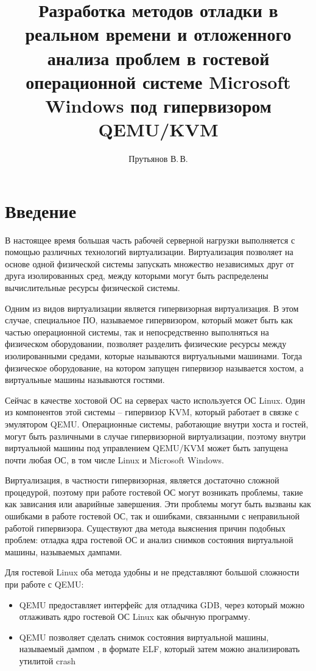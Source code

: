 \documentclass{mipt-thesis-bs}
\title{Разработка методов отладки в реальном времени и отложенного анализа проблем в гостевой операционной системе Microsoft Windows под гипервизором QEMU/KVM}
\author{Прутьянов В.\,В.}
\begin{document}
\titlecontents

\chapter{Введение}

В настоящее время большая часть рабочей серверной нагрузки выполняется с помощью различных технологий виртуализации. Виртуализация позволяет на основе одной физической системы запускать множество независимых друг от друга изолированных сред, между которыми могут быть распределены вычислительные ресурсы физической системы.

Одним из видов виртуализации является гипервизорная виртуализация. В этом случае, специальное ПО, называемое гипервизором, который может быть как частью операционной системы, так и непосредственно выполняться на физическом оборудовании, позволяет разделить физические ресурсы между изолированными средами, которые называются виртуальными машинами. Тогда физическое оборудование, на котором запущен гипервизор называется хостом, а виртуальные машины называются гостями.

Сейчас в качестве хостовой ОС на серверах часто используется ОС Linux. Один из компонентов этой системы -- гипервизор KVM, который работает в связке с эмулятором QEMU. Операционные системы, работающие внутри хоста и гостей, могут быть различными в случае гипервизорной виртуализации, поэтому внутри виртуальной машины под управлением QEMU/KVM может быть запущена почти любая ОС, в том числе Linux и Microsoft Windows.

Виртуализация, в частности гипервизорная, является достаточно сложной процедурой, поэтому при работе гостевой ОС могут возникать проблемы, такие как зависания или аварийные завершения. Эти проблемы могут быть вызваны как ошибками в работе гостевой ОС, так и ошибками, связанными с неправильной работой гипервизора. Существуют два метода выяснения причин подобных проблем: отладка ядра гостевой ОС и анализ снимков состояния виртуальной машины, называемых дампами.

Для гостевой Linux оба метода удобны и не представляют большой сложности при работе с QEMU:

\begin{itemize}
\item QEMU предоставляет интерфейс для отладчика GDB, через который можно отлаживать ядро гостевой ОС Linux как обычную программу.
\item QEMU позволяет сделать снимок состояния виртуальной машины, называемый дампом , в формате ELF, который затем можно анализировать утилитой crash
\end{itemize}
\end{document}
